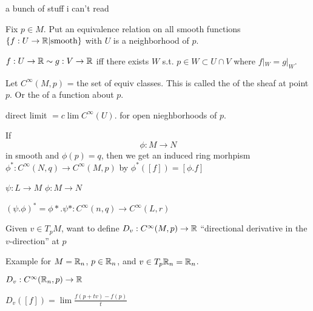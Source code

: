 \documentclass[11pt]{amsbook}
\theoremstyle{mystyle} \newtheorem{thrm}[thm]{Theorem}
\theoremstyle{mystyle} \newtheorem{defi}[thm]{Definition}
\theoremstyle{mystyle} \newtheorem{coro}[thm]{Corollary}
\theoremstyle{mystyle} \newtheorem{propo}[thm]{Proposition}
\theoremstyle{mystyle} \newtheorem{lemm}[thm]{Lemma}
\numberwithin{thm}{section}
\begin{document}
a bunch of stuff i can't read

Fix $p \in M$.
Put an equivalence relation on all smooth functions $\{ f : U \to {\mathbb R} | \text{smooth}\}$
with $U$ is a neighborhood of $p$.

$f:U \to {\mathbb R} \sim g:V \to {\mathbb R}$
iff
there exists $W$ s.t. $p \in W \subset U \cap V$ where $f|_W = g|_W$.

Let $C^\infty(M,p)$ = the set of equiv classes.  This is called the  of the sheaf at point $p$.  Or the  of a function about $p$.

direct limit
$= c\lim C^\infty(U)$.
for open nieghborhoods of $p$.

If $$\phi: M \to N$$ in smooth and $\phi(p) = q$, then we get an induced ring morhpism
$\phi^* : C^\infty(N,q) \to C^\infty(M,p)$ by
$\phi^*([f]) = [\phi.f]$

$\psi : L \to M$
$\phi : M \to N$

$(\psi.\phi)^* = \phi*.\psi* : C^\infty(n,q) \to C^\infty(L,r)$

Given $v \in T_pM$, want to define
$D_v : C^\infty(M,p) \to {\mathbb R}$
``directional derivative in the $v$-direction'' at $p$

Example for $M = {\mathbb R}_n$, $p \in {\mathbb R}_n$, and $v \in T_p{\mathbb R}_n = {\mathbb R}_n$.

$D_v : C^\infty({\mathbb R}_n, p) \to {\mathbb R}$

$D_v([f]) = \lim \frac{f(p + tv) - f(p)}{t}$
\end{document}
